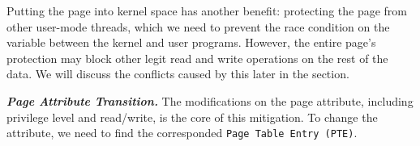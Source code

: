 Putting the page into kernel space has another benefit: protecting the page from other user-mode threads, which we need to prevent the race condition on the variable between the kernel and user programs. However, the entire page's protection may block other legit read and write operations on the rest of the data. We will discuss the conflicts caused by this later in the section.




\textbf{\textit{Page Attribute Transition.}} The modifications on the page attribute, including privilege level and read/write, is the core of this mitigation. To change the attribute, we need to find the corresponded \texttt{Page Table Entry (PTE)}.  


%
%
%


